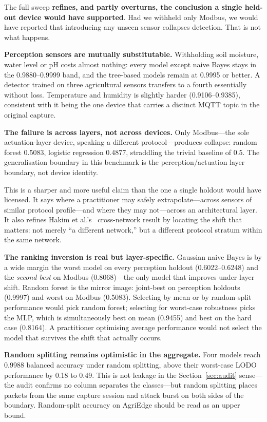 The full sweep \textbf{refines, and partly overturns, the conclusion a single
held-out device would have supported}. Had we withheld only Modbus, we would
have reported that introducing any unseen sensor collapses detection. That is
not what happens.

\textbf{Perception sensors are mutually substitutable.} Withholding soil
moisture, water level or pH costs almost nothing: every model except naive
Bayes stays in the 0.9880--0.9999 band, and the tree-based models
remain at 0.9995 or better. A detector trained on three agricultural sensors transfers to a fourth
essentially without loss. Temperature and humidity is slightly harder
(0.9106--0.9385), consistent with it being the one device that carries a
distinct MQTT topic in the original capture.

\textbf{The failure is across layers, not across devices.} Only Modbus---the
sole actuation-layer device, speaking a different protocol---produces collapse:
random forest 0.5083, logistic regression 0.4877, straddling the trivial
baseline of 0.5. The generalisation boundary in this benchmark is the
perception/actuation layer boundary, not device identity.

This is a sharper and more useful claim than the one a single holdout would
have licensed. It says where a practitioner may safely extrapolate---across
sensors of similar protocol profile---and where they may not---across an
architectural layer. It also refines Hakim et al.'s~\cite{hakim2026crossdomain}
cross-network result by locating the shift that matters: not merely ``a
different network,'' but a different protocol stratum within the same network.

\textbf{The ranking inversion is real but layer-specific.} Gaussian naive Bayes
is by a wide margin the worst model on every perception holdout
(0.6022--0.6248) and the \emph{second best} on Modbus (0.8068)---the only model
that improves under layer shift. Random forest is the mirror image: joint-best
on perception holdouts (0.9997) and worst on Modbus (0.5083). Selecting by mean
or by random-split performance would pick random forest; selecting for
worst-case robustness picks the MLP, which is simultaneously best on mean
(0.9455) and best on the hard case (0.8164). A practitioner optimising average
performance would not select the model that survives the shift that actually
occurs.

\textbf{Random splitting remains optimistic in the aggregate.} Four models
reach 0.9988 balanced accuracy under random splitting, above their worst-case
LODO performance by 0.18 to 0.49. This is not leakage in the
Section~\ref{sec:audit} sense---the audit confirms no column separates the
classes---but random splitting places packets from the same capture session and
attack burst on both sides of the boundary. Random-split accuracy on AgriEdge
should be read as an upper bound.

